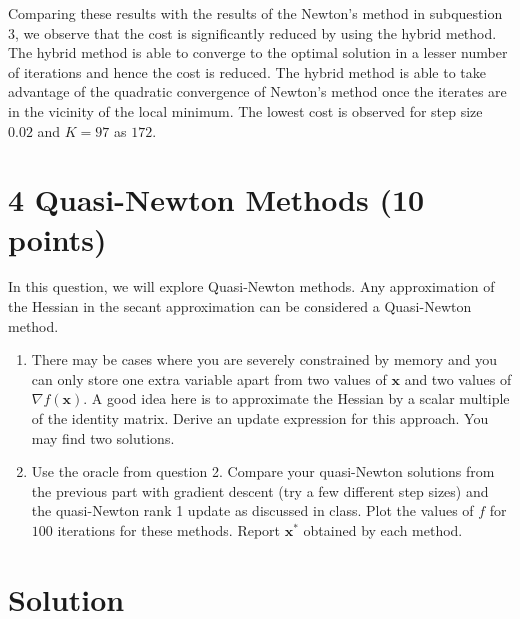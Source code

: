 \documentclass[12pt,a4paper]{article}
\theoremstyle{remark}
\begin{document}
Comparing these results with the results of the Newton's method in subquestion 3, we observe that the cost is significantly reduced by using the hybrid method. The hybrid method is able to converge to the optimal solution in a lesser number of iterations and hence the cost is reduced. The hybrid method is able to take advantage of the quadratic convergence of Newton's method once the iterates are in the vicinity of the local minimum. The lowest cost is observed for step size $0.02$ and $K = 97$ as $172$.

\clearpage

\section*{4 Quasi-Newton Methods (10 points)}

In this question, we will explore Quasi-Newton methods. Any approximation of the Hessian in the secant approximation can be considered a Quasi-Newton method.

\begin{enumerate}
    \item There may be cases where you are severely constrained by memory and you can
    only store one extra variable apart from two values of $\mathbf{x}$ and two values of $\nabla f(\mathbf{x})$. A good idea here is to approximate the Hessian by a scalar multiple of the identity matrix. Derive an update expression for this approach. You may find two solutions.
    \item Use the oracle from question 2. Compare your quasi-Newton solutions from the
    previous part with gradient descent (try a few different step sizes) and the quasi-Newton
    rank 1 update as discussed in class. Plot the values of $f$ for $100$ iterations for these methods. Report $\mathbf{x}^*$ obtained by each method.
\end{enumerate}

\section*{Solution}
\end{document}
